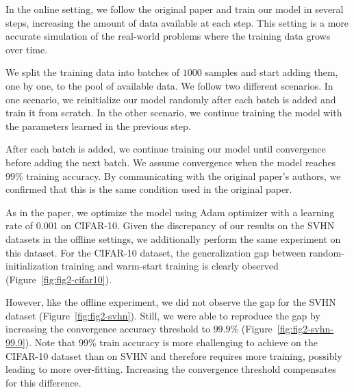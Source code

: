 %




In the online setting, we follow the original paper and train our model in several steps, increasing the amount of data available at each step. This setting is a more accurate simulation of the real-world problems where the training data grows over time. 
%

%

We split the training data into batches of $1000$ samples and start adding them, one by one, to the pool of available data. We follow two different scenarios. In one scenario, we reinitialize our model randomly after each batch is added and train it from scratch. In the other scenario, we continue training the model with the parameters learned in the previous step. 


After each batch is added, we continue training our model until convergence before adding the next batch. We assume convergence when the model reaches 99\% training accuracy. By communicating with the original paper's authors, we confirmed that this is the same condition used in the original paper.


%
%
%
%
%
%
%

%


As in the paper, we optimize the model using Adam optimizer with a learning rate of 0.001 on CIFAR-10. Given the discrepancy of our results on the SVHN datasets in the offline settings, we additionally perform the same experiment on this dataset. For the CIFAR-10 dataset, the generalization gap between random-initialization training and warm-start training is clearly observed (Figure~\ref{fig:fig2-cifar10}). 

However, like the offline experiment, we did not observe the gap for the SVHN dataset (Figure~\ref{fig:fig2-svhn}). Still, we were able to reproduce the gap by increasing the convergence accuracy threshold to $99.9\%$ (Figure~\ref{fig:fig2-svhn-99.9}). Note that 99\% train accuracy is more challenging to achieve on the CIFAR-10 dataset than on SVHN and therefore requires more training, possibly leading to more over-fitting. Increasing the convergence threshold compensates for this difference. 

